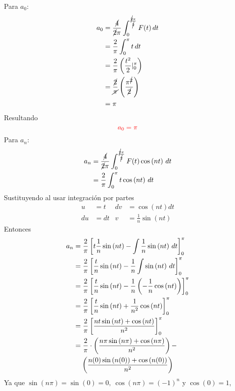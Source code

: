 \begin{multicols}{2}
Para $a_0$:
\begin{align*}
    a_0 &= \frac{\cancel{4}}{\cancel{2}\pi} \int_{0}^{\frac{\cancel{2}\pi}{\cancel{2}}} F(t) \,dt\\
    &= \frac{2}{\pi} \int_{0}^{\pi} t \,dt\\
    &= \frac{2}{\pi} \left(\frac{t^{2}}{2} |_{0}^{\pi} \right)\\
    &= \frac{\cancel{2}}{\cancel{\pi}} \left(\frac{\pi^{\cancel{2}}}{\cancel{2}}\right)\\
    &= \pi
\end{align*}
Resultando
\begin{equation}
    \textcolor{rojo}{a_0 = \pi}
    \label{res:15}
\end{equation}
Para $a_n$:
\begin{align*}
    a_n &= \frac{\cancel{4}}{\cancel{2}\pi} \int_{0}^{\frac{\cancel{2}\pi}{\cancel{2}}} F(t) \cos\left(nt\right) \,dt\\
    &= \frac{2}{\pi} \int_{0}^{\pi} t \cos\left(nt\right) \,dt
\end{align*}
Sustituyendo al usar integración por partes
\begin{align*}
    u&=t           &  dv&=\cos\left(nt\right) dt\\
    du&=dt         &  v&=\frac{1}{n} \sin\left(nt\right)
\end{align*}
Entonces
\begin{align*}
    a_n &= \frac{2}{\pi} \left[t\frac{1}{n} \sin\left(nt\right) - \int \frac{1}{n}\sin\left(nt\right) \,dt\right]_{0}^{\pi}\\
    &= \frac{2}{\pi} \left[\frac{t}{n} \sin\left(nt\right) - \frac{1}{n}\int \sin\left(nt\right) \,dt\right]_{0}^{\pi}\\
    &= \frac{2}{\pi} \left[\frac{t}{n} \sin\left(nt\right) - \frac{1}{n}\left(-\frac{1}{n} \cos\left(nt\right)\right)\right]_{0}^{\pi}\\
    &= \frac{2}{\pi} \left[\frac{t}{n} \sin\left(nt\right) + \frac{1}{n^{2}} \cos\left(nt\right)\right]_{0}^{\pi}\\
    &= \frac{2}{\pi} \left[\frac{nt \sin\left(nt\right) + \cos\left(nt\right)}{n^{2}}\right]_{0}^{\pi}\\
    &= \frac{2}{\pi} \cdot \left(\frac{n\pi \sin\left(n\pi\right) + \cos\left(n\pi\right)}{n^{2}}\right) -\\ 
    &\hphantom{=}~ \left(\frac{n(0) \sin\left(n(0)\right) + \cos\left(n(0)\right)}{n^{2}}\right)
\end{align*}
Ya que $\sin\left(n\pi\right) = \sin\left(0\right) = 0,~ \cos\left(n\pi\right) = \left(-1\right)^{n}$ y $\cos\left(0\right) = 1$,

\end{multicols}
